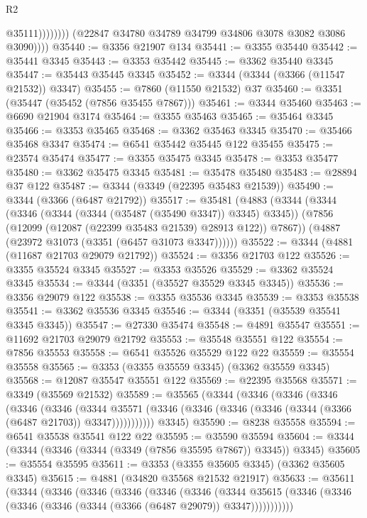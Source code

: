 \begin{lexlean}{R2}
\begin{coremodule}
                          @35111))))))))
          (@22847 @34780 @34789 @34799 @34806 @3078 @3082 @3086 @3090))))
@35440 := @3356 @21907 @134
@35441 := @3355 @35440
@35442 := @35441 @3345
@35443 := @3353 @35442
@35445 := @3362 @35440 @3345
@35447 := @35443 @35445 @3345
@35452 := @3344 (@3344 (@3366 (@11547 @21532)) @3347)
@35455 := @7860 (@11550 @21532) @37
@35460 := @3351 (@35447 (@35452 (@7856 @35455 @7867)))
@35461 := @3344 @35460
@35463 := @6690 @21904 @3174
@35464 := @3355 @35463
@35465 := @35464 @3345
@35466 := @3353 @35465
@35468 := @3362 @35463 @3345
@35470 := @35466 @35468 @3347
@35474 := @6541 @35442 @35445 @122 @35455
@35475 := @23574 @35474
@35477 := @3355 @35475 @3345
@35478 := @3353 @35477
@35480 := @3362 @35475 @3345
@35481 := @35478 @35480
@35483 := @28894 @37 @122
@35487 := @3344 (@3349 (@22395 @35483 @21539))
@35490 := @3344 (@3366 (@6487 @21792))
@35517 := @35481
    (@4883
      (@3344
        (@3344
          (@3346 (@3344 (@3344 (@35487 (@35490 @3347)) @3345) @3345))
          (@7856 (@12099 (@12087 (@22399 @35483 @21539) @28913 @122)) @7867))
        (@4887 (@23972 @31073 (@3351 (@6457 @31073 @3347))))))
@35522 := @3344 (@4881 (@11687 @21703 @29079 @21792))
@35524 := @3356 @21703 @122
@35526 := @3355 @35524 @3345
@35527 := @3353 @35526
@35529 := @3362 @35524 @3345
@35534 := @3344 (@3351 (@35527 @35529 @3345 @3345))
@35536 := @3356 @29079 @122
@35538 := @3355 @35536 @3345
@35539 := @3353 @35538
@35541 := @3362 @35536 @3345
@35546 := @3344 (@3351 (@35539 @35541 @3345 @3345))
@35547 := @27330 @35474
@35548 := @4891 @35547
@35551 := @11692 @21703 @29079 @21792
@35553 := @35548 @35551 @122
@35554 := @7856 @35553
@35558 := @6541 @35526 @35529 @122 @22
@35559 := @35554 @35558
@35565 := @3353 (@3355 @35559 @3345) (@3362 @35559 @3345)
@35568 := @12087 @35547 @35551 @122
@35569 := @22395 @35568
@35571 := @3349 (@35569 @21532)
@35589 := @35565
    (@3344
      (@3346
        (@3346
          (@3346
            (@3346
              (@3346
                (@3344
                  @35571
                  (@3346 (@3346 (@3346 (@3346 (@3344 (@3366 (@6487 @21703)) @3347)))))))))))
      @3345)
@35590 := @8238 @35558
@35594 := @6541 @35538 @35541 @122 @22
@35595 := @35590 @35594
@35604 := @3344 (@3344 (@3346 (@3344 (@3349 (@7856 @35595 @7867)) @3345)) @3345)
@35605 := @35554 @35595
@35611 := @3353 (@3355 @35605 @3345) (@3362 @35605 @3345)
@35615 := @4881 (@34820 @35568 @21532 @21917)
@35633 := @35611
    (@3344
      (@3346
        (@3346
          (@3346
            (@3346
              (@3346
                (@3344
                  @35615
                  (@3346 (@3346 (@3346 (@3346 (@3344 (@3366 (@6487 @29079)) @3347)))))))))))

\end{coremodule}
\end{lexlean}
